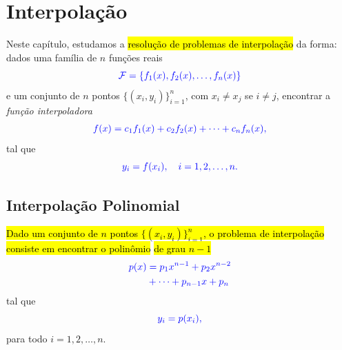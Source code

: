 \chapter{Interpolação}\label{cap_interp}

Neste capítulo, estudamos a \hl{resolução de problemas de interpolação} da forma: dados uma família de $n$ funções reais
\begin{equation}\color{blue}\mathcal{F} = \{f_1(x), f_2(x), \dotsc, f_n(x)\}
\end{equation}
e um conjunto de $n$ pontos $\{(x_i, y_i)\}_{i=1}^n$, com $x_i\neq x_j$ se $i\neq j$, encontrar a \emph{função interpoladora}
\begin{equation}\color{blue}\begin{aligned}
    f(x) = c_1f_1(x) + c_2f_2(x) + \cdots + c_nf_n(x),
  \end{aligned}
\end{equation}
tal que
\begin{equation}\color{blue}y_i = f(x_i),\quad i=1, 2, \ldots, n.
\end{equation}

\section{Interpolação Polinomial}\label{cap_interp_sec_interpoli}

\hl{Dado um conjunto de $n$ pontos $\{(x_i, y_i)\}_{i=1}^n$, o problema de interpolação consiste em encontrar o polinômio} \hl{de grau $n-1$}
\begin{equation}\label{cap_interp_sec_interpoli:eq:interpoli_poli}\color{blue}\begin{aligned}
    p(x) &= p_1x^{n-1} + p_2x^{n-2} \\
         &+ \cdots + p_{n-1}x + p_n
  \end{aligned}
\end{equation}
tal que
\begin{equation}\label{cap_interp_sec_interpoli:eq:interpoli_conds}\color{blue}y_i = p(x_i),
\end{equation}
para todo $i=1, 2, \dotsc, n$.

